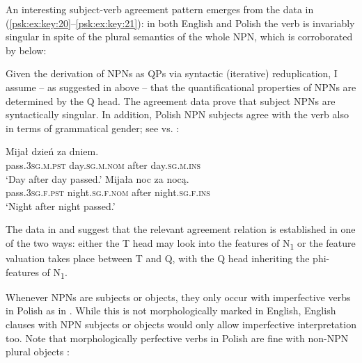 \documentclass[output=paper]{langscibook}
\begin{document}
\noindent An interesting subject-verb agreement pattern emerges from the data in (\ref{psk:ex:key:20}--\ref{psk:ex:key:21}): in both English and Polish the verb is invariably singular in spite of the plural semantics of the whole NPN, which is corroborated by  below:

\ea \label{psk:ex:key:22}  
\z
\z

\noindent Given the derivation of NPNs as QPs via syntactic (iterative) reduplication, I assume – as suggested in  above – that the quantificational properties of NPNs are determined by the Q head. The agreement data prove that subject NPNs are syntactically singular. In addition, Polish NPN subjects agree with the verb also in terms of grammatical gender; see  vs. :

\ea \label{psk:ex:23}\ea \gll Mijał dzień za dniem.\\
      pass.\textsc{3sg.m.pst} day.\textsc{sg.m.nom} after day.\textsc{sg.m.ins}\\
\glt      ‘Day after day passed.’\label{psk:ex:23:a}
\ex \gll  Mijała noc za    nocą.\\
      pass.\textsc{3sg.f.pst} night.\textsc{sg.f.nom} after night.\textsc{sg.f.ins}\\
\glt      ‘Night after night passed.’\label{psk:ex:23:b}\z
\z

\noindent The data in  and  suggest that the relevant agreement relation is established in one of the two ways: either the T head may look into the features of N\textsubscript{1} or the feature valuation takes place between T and Q, with the Q head inheriting the phi-features of N\textsubscript{1}.

Whenever NPNs are subjects or objects, they only occur with imperfective verbs in Polish as in . While this is not morphologically marked in English, English clauses with NPN subjects or objects would only allow imperfective interpretation too. Note that morphologically perfective verbs in Polish are fine with non-NPN plural objects :
\end{document}
